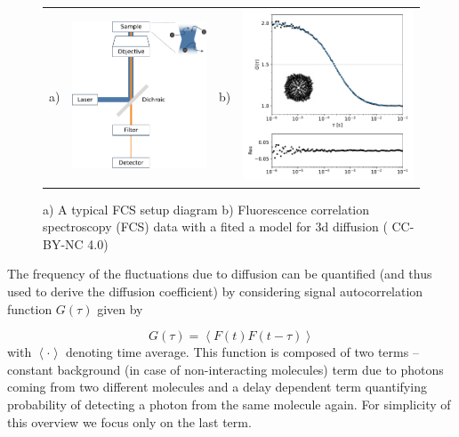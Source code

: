 \documentclass{doctoral}
\begin{document}
\begin{figure}[h]
    \centering
    \begin{tabular}{llll}
        a)                                                                           &
        \includegraphics[height=0.4\linewidth,valign=t]{figures/fcs_setup_clean.pdf} &
        b)                                                                           &
        \includegraphics[height=0.4\linewidth,valign=t,trim=0 0 0 0.5cm]{figures/fcs_data_and_fit.pdf}
    \end{tabular}

    \caption{a) A typical FCS setup diagram  b) Fluorescence correlation spectroscopy (FCS) data with a fited a model for 3d diffusion (\textcite{Waszkiewicz_2024_mda}
        CC-BY-NC 4.0)} \label{fig:fcs_diagram}
\end{figure}

The frequency of the fluctuations due to diffusion can be quantified (and thus used to derive the diffusion coefficient) by considering signal autocorrelation function $G(\tau)$ given by 

\begin{equation}
    G(\tau) = \left< F(t) F(t-\tau) \right>
\end{equation}
with $\left< \cdot \right>$ denoting time average.
This function is composed of two terms -- constant background (in case of non-interacting molecules) term due to photons coming from two different molecules and a delay dependent term quantifying probability of detecting a photon from the same molecule again.
For simplicity of this overview we focus only on the last term.
\end{document}
